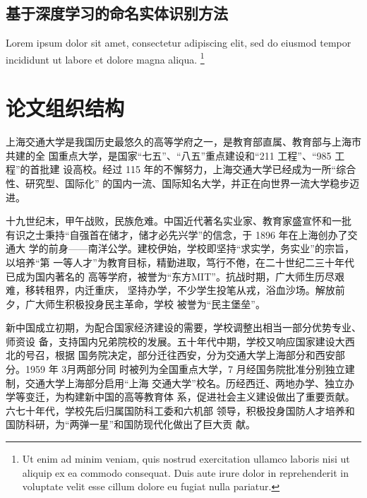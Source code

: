 \subsection{基于深度学习的命名实体识别方法}

Lorem ipsum dolor sit amet, consectetur adipiscing elit, sed do eiusmod tempor
incididunt ut labore et dolore magna aliqua. \footnote{Ut enim ad minim veniam,
quis nostrud exercitation ullamco laboris nisi ut aliquip ex ea commodo
consequat. Duis aute irure dolor in reprehenderit in voluptate velit esse cillum
dolore eu fugiat nulla pariatur.}

\section{论文组织结构}


上海交通大学是我国历史最悠久的高等学府之一，是教育部直属、教育部与上海市共建的全
国重点大学，是国家“七五”、“八五”重点建设和“211 工程”、“985 工程”的首批建
设高校。经过 115 年的不懈努力，上海交通大学已经成为一所“综合性、研究型、国际化”
的国内一流、国际知名大学，并正在向世界一流大学稳步迈进。 

{\songti 十九世纪末，甲午战败，民族危难。中国近代著名实业家、教育家盛宣怀和一批
  有识之士秉持“自强首在储才，储才必先兴学”的信念，于 1896 年在上海创办了交通大
  学的前身——南洋公学。建校伊始，学校即坚持“求实学，务实业”的宗旨，以培养“第
  一等人才”为教育目标，精勤进取，笃行不倦，在二十世纪二三十年代已成为国内著名的
  高等学府，被誉为“东方MIT”。抗战时期，广大师生历尽艰难，移转租界，内迁重庆，
  坚持办学，不少学生投笔从戎，浴血沙场。解放前夕，广大师生积极投身民主革命，学校
  被誉为“民主堡垒”。
  
  新中国成立初期，为配合国家经济建设的需要，学校调整出相当一部分优势专业、师资设
  备，支持国内兄弟院校的发展。五十年代中期，学校又响应国家建设大西北的号召，根据
  国务院决定，部分迁往西安，分为交通大学上海部分和西安部分。1959 年 3月两部分同
  时被列为全国重点大学，7 月经国务院批准分别独立建制，交通大学上海部分启用“上海
  交通大学”校名。历经西迁、两地办学、独立办学等变迁，为构建新中国的高等教育体
  系，促进社会主义建设做出了重要贡献。六七十年代，学校先后归属国防科工委和六机部
  领导，积极投身国防人才培养和国防科研，为“两弹一星”和国防现代化做出了巨大贡
  献。}

